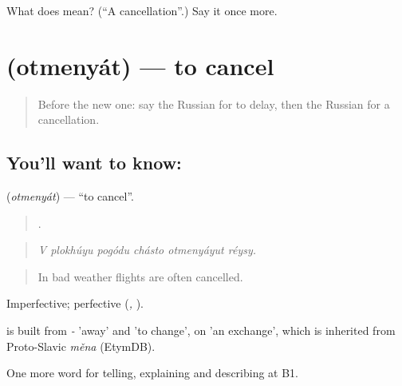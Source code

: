 \begin{tcolorbox}[breakable,colback=teal!4,colframe=teal!35!black,title={Before you move on}]
What does  mean? (\textquotedblleft{}A cancellation\textquotedblright{}.) Say it once more.
\end{tcolorbox}
\section[\texorpdfstring{\ru{отменять} (otmenyát)}{отменять (otmenyát)}]{ (otmenyát) — to cancel}

\label{lesson:RU-C423-otmenyat}



\begin{quote}
Before the new one: say the Russian for to delay, then the Russian for a cancellation.
\end{quote}

\subsection*{You'll want to know: }
\textbf{} (\emph{otmenyát}) — \textquotedblleft{}to cancel\textquotedblright{}.

\begin{quote}
     .
\end{quote}

\begin{quote}
\emph{V plokhúyu pogódu chásto otmenyáyut réysy.}
\end{quote}

\begin{quote}
In bad weather flights are often cancelled.
\end{quote}

Imperfective; perfective \emph{} (\emph{, }).

\begin{cousinweb}
\emph{} is built from \emph{-} 'away' and \emph{} 'to change', on \emph{} 'an exchange', which is inherited from Proto-Slavic \emph{měna} (EtymDB).
\end{cousinweb}

\begin{grammarlens}[title={What you've built}]
One more word for telling, explaining and describing at B1.
\end{grammarlens}

